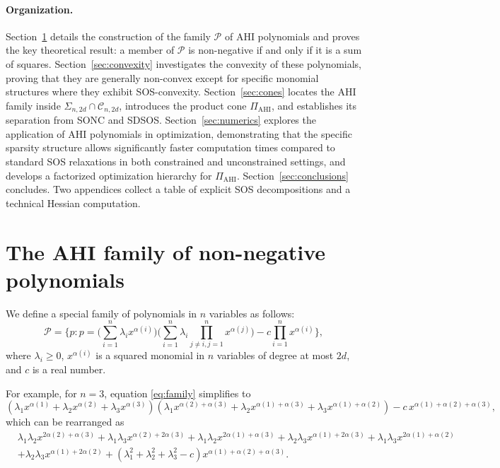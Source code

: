 \documentclass[12pt]{elsarticle}
\theoremstyle{definition}
\newcommand{\AHI}{\mathrm{AHI}}
\newcommand{\PiAHI}{\Pi_{\AHI}}
\newcommand{\SONC}{\mathcal{C}}
\begin{document}
\paragraph{Organization.}
Section~\ref{sec:family} details the construction of the family $\mathcal{P}$ of AHI polynomials and proves the key theoretical result: a member of $\mathcal{P}$ is non-negative if and only if it is a sum of squares. Section~\ref{sec:convexity} investigates the convexity of these polynomials, proving that they are generally non-convex except for specific monomial structures where they exhibit SOS-convexity. Section~\ref{sec:cones} locates the AHI family inside $\Sigma_{n,2d}\cap\SONC_{n,2d}$, introduces the product cone $\PiAHI$, and establishes its separation from SONC and SDSOS. Section~\ref{sec:numerics} explores the application of AHI polynomials in optimization, demonstrating that the specific sparsity structure allows significantly faster computation times compared to standard SOS relaxations in both constrained and unconstrained settings, and develops a factorized optimization hierarchy for $\PiAHI$. Section~\ref{sec:conclusions} concludes. Two appendices collect a table of explicit SOS decompositions and a technical Hessian computation.

\section{The AHI family of non-negative polynomials}\label{sec:family}

We define a special family of polynomials in $n$ variables as follows:
\begin{equation}\label{eq:family}
\mathcal{P}=\Big\{p: p=
\Big(\sum_{i=1}^n \lambda_i x^{\alpha(i)}\Big) \Big(\sum_{i=1}^n \lambda_i \prod_{{j\neq i}, j=1}^n x^{\alpha(j)}\Big) - c\prod_{i=1}^n x^{\alpha(i)}\Big\},
\end{equation}
where $\lambda_i \geq 0$, $x^{\alpha(i)}$ is a squared monomial in $n$ variables of degree at most $2d$, and $c$ is a real number.

For example, for $n=3$, equation \eqref{eq:family} simplifies to
\[
  (\lambda_1 x^{\alpha(1)} + \lambda_2 x^{\alpha(2)} + \lambda_3 x^{\alpha(3)})(\lambda_1 x^{\alpha(2)+\alpha(3)} + \lambda_2 x^{\alpha(1)+\alpha(3)} + \lambda_3 x^{\alpha(1)+\alpha(2)}) - c\, x^{\alpha(1)+\alpha(2)+\alpha(3)},
\]
which can be rearranged as
\[
\begin{aligned}
 & \lambda_1\lambda_2 x^{2\alpha(2)+\alpha(3)} + \lambda_1\lambda_3 x^{\alpha(2)+2\alpha(3)} + \lambda_1\lambda_2 x^{2\alpha(1)+\alpha(3)} +\lambda_2\lambda_3 x^{\alpha(1)+2\alpha(3)} +
  \lambda_1\lambda_3 x^{2\alpha(1)+\alpha(2)} \\ &+\lambda_2\lambda_3 x^{\alpha(1)+2\alpha(2)}
  + (\lambda_1^2 + \lambda_2^2 + \lambda_3^2 - c) x^{\alpha(1)+\alpha(2)+\alpha(3)}.
  \end{aligned}
\]
\end{document}
